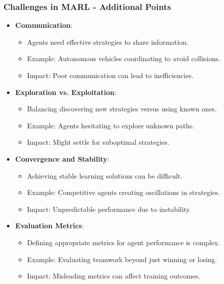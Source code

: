 \documentclass[aspectratio=169]{beamer}
\begin{document}
\begin{frame}[fragile]
    \frametitle{Challenges in MARL - Additional Points}
    \begin{itemize}
        \item \textbf{Communication}:
        \begin{itemize}
            \item Agents need effective strategies to share information.
            \item Example: Autonomous vehicles coordinating to avoid collisions.
            \item Impact: Poor communication can lead to inefficiencies.
        \end{itemize}
        
        \item \textbf{Exploration vs. Exploitation}:
        \begin{itemize}
            \item Balancing discovering new strategies versus using known ones.
            \item Example: Agents hesitating to explore unknown paths.
            \item Impact: Might settle for suboptimal strategies.
        \end{itemize}
        
        \item \textbf{Convergence and Stability}:
        \begin{itemize}
            \item Achieving stable learning solutions can be difficult.
            \item Example: Competitive agents creating oscillations in strategies.
            \item Impact: Unpredictable performance due to instability.
        \end{itemize}
        
        \item \textbf{Evaluation Metrics}:
        \begin{itemize}
            \item Defining appropriate metrics for agent performance is complex.
            \item Example: Evaluating teamwork beyond just winning or losing.
            \item Impact: Misleading metrics can affect training outcomes.
        \end{itemize}
    \end{itemize}
\end{frame}
\end{document}
